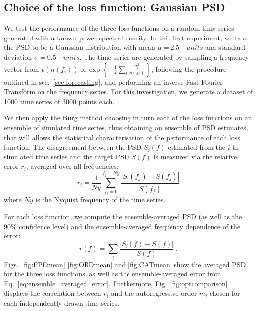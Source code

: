 \documentclass[twocolumn,showpacs,preprintnumbers,nofootinbib,prd,
superscriptaddress,10pt]{revtex4-1}
\begin{document}
\subsection{Choice of the loss function: Gaussian PSD} \label{sec:arp_validation}
We test the performance of the three loss functions on a random time series generated with a known power spectral density.
In this first experiment, we take the PSD to be a Gaussian distribution with mean $\mu = 2.5 \quad units$ and standard deviation $\sigma = 0.5 \quad units$.
The time series are generated by sampling a frequency vector from ${p(\tilde{n}(f_i)) \propto \exp{\left\{-\frac{1}{2}\sum_i\frac{n_i ^2}{S(f_i)}\right\}}}$, following the procedure outlined in sec.~\ref{sec:forecasting}, and performing an inverse Fast Fourier Transform on the frequency series. 
For this investigation, we generate a dataset of 1000 time series of 3000 points each.

We then apply the Burg method choosing in turn each of the loss functions on an ensemble of simulated time series, 
thus obtaining an ensemble of PSD estimates, that will allows the statistical characterisation of the performance of each loss function.
The disagreement between the PSD $S_i(f)$ estimated from the $i$-th simulated time series and the target PSD $S(f)$ is measured via 
the relative error $r_i$, averaged over all frequencies:
\begin{equation}\label{eq:freq_error}
r_i = \frac{1}{Ny}\sum_{f_j=0}^{f_j = Ny} \frac{|S_i(f_j) - S(f_j)|}{S(f_j)}
\end{equation}
where $Ny$ is the Nyquist frequency of the time series.

For each loss function, we compute the ensemble-averaged PSD (as well as the $90\%$ confidence level) and the ensemble-averaged frequency dependence of the error:
\begin{equation}\label{eq:ensemble_averaged_error}
	r(f) = \sum_i \frac{|S_i(f) - S(f)|}{S(f)} \;.
\end{equation}
Figs.~\ref{fig:FPEmean} \ref{fig:OBDmean} and \ref{fig:CATmean} show the averaged PSD for the three loss functions, 
as well as the ensemble-averaged error from Eq.~\eqref{eq:ensemble_averaged_error}.
Furthermore, Fig.~\ref{fig:optcomparison} displays the correlation between $r_i$ and the autoregressive 
order $m_i$ chosen for each independently drawn time series.

\end{document}
